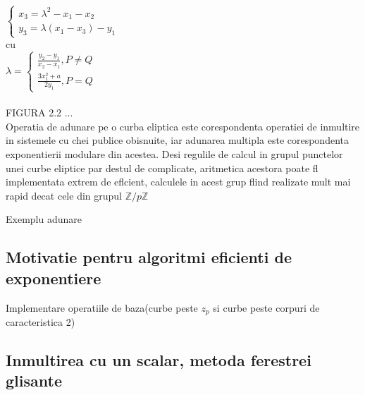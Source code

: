 $\begin{cases} 
    x_3 = \lambda^2 - x_1 - x_2 \\
    y_3 =  \lambda (x_1-x_3) - y_1
   \end{cases}$
 \\cu 
 \\$
 \lambda = 
 \begin{cases}
 \frac{y_2 - y_1}{x_2 - x_1}, P \neq Q \\ 
 \frac{3x^{2}_1 + a}{2y_1}, P = Q
 \end{cases}$ \\
 \\ FIGURA 2.2 ... \\
Operatia de adunare pe o curba eliptica este corespondenta operatiei de inmultire
in sistemele cu chei publice obisnuite, iar adunarea multipla este corespondenta
exponentierii modulare din acestea.
Desi regulile de calcul in grupul punctelor unei curbe eliptice par destul de complicate, aritmetica acestora poate fl implementata extrem de eflcient, calculele in acest grup flind realizate mult mai rapid decat cele din grupul $\mathbb{Z}/p\mathbb{Z}$
\begin{ex}
Exemplu adunare
\end{ex}

\subsection{Motivatie pentru algoritmi eficienti de exponentiere}
\label{subsec:subsec01}
Implementare operatiile de baza(curbe peste $z_p$ si curbe peste corpuri de caracteristica 2)

\subsection{Inmultirea cu un scalar, metoda ferestrei glisante}
\label{subsec:subsec02}




